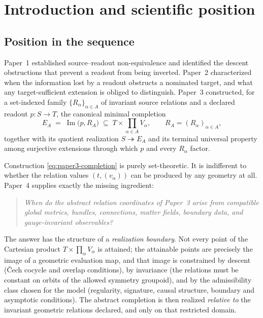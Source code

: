 \documentclass[11pt,a4paper]{article}
\theoremstyle{plain}
\theoremstyle{definition}
\theoremstyle{remark}
\newcommand{\Imm}{\operatorname{Im}}
\begin{document}
\tableofcontents

\section{Introduction and scientific position}
\label{sec:intro}

\subsection{Position in the sequence}

Paper~1 \cite{ST1} established source--readout non-equivalence and identified the descent
obstructions that prevent a readout from being inverted. Paper~2 \cite{ST2} characterized when
the information lost by a readout obstructs a nominated target, and what any target-sufficient
extension is obliged to distinguish. Paper~3 \cite{ST3} constructed, for a set-indexed family
$\{R_\alpha\}_{\alpha\in A}$ of invariant source relations and a declared readout
$p\colon S\to T$, the canonical minimal completion
\begin{equation}
\label{eq:paper3-completion}
E_A \;=\; \Imm\bigl(p,R_A\bigr)
\;\subseteq\; T\times\prod_{\alpha\in A}V_\alpha ,
\qquad
R_A=(R_\alpha)_{\alpha\in A},
\end{equation}
together with its quotient realization $S\twoheadrightarrow E_A$ and its terminal universal
property among surjective extensions through which $p$ and every $R_\alpha$ factor.

Construction \eqref{eq:paper3-completion} is purely set-theoretic. It is indifferent to whether
the relation values $(t,(v_\alpha))$ can be produced by any geometry at all. Paper~4 supplies
exactly the missing ingredient:

\begin{quote}
\emph{When do the abstract relation coordinates of Paper~3 arise from compatible global
metrics, bundles, connections, matter fields, boundary data, and gauge-invariant observables?}
\end{quote}

The answer has the structure of a \emph{realization boundary}. Not every point of the Cartesian
product $T\times\prod_\alpha V_\alpha$ is attained; the attainable points are precisely the
image of a geometric evaluation map, and that image is constrained by descent (\v{C}ech
cocycle and overlap conditions), by invariance (the relations must be constant on orbits of the
allowed symmetry groupoid), and by the admissibility class chosen for the model (regularity,
signature, causal structure, boundary and asymptotic conditions). The abstract completion is
then realized \emph{relative to} the invariant geometric relations declared, and only on that
restricted domain.
\end{document}
